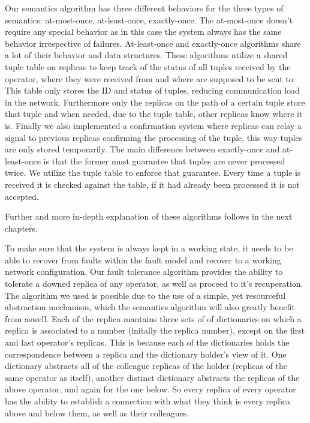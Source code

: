 \documentclass[times, 10pt,twocolumn]{article}
\begin{document}
	Our semantics algorithm has three different behaviors for the three types 
of semantics: at-most-once, at-least-once, exactly-once. The at-most-once
doesn't require any special behavior as in this case the system always has the same 
behavior irrespective of failures. At-least-once and exactly-once algorithms share 
a lot of their behavior and data structures. These algorithms utilize a shared tuple table
on replicas to keep track of the status of all tuples received by the operator, 
where they were received from and where are supposed to be sent to. This
table only stores the ID and status of tuples, reducing communication load in the
network. Furthermore only the replicas on the path of a certain tuple store that tuple 
and when needed, due to the tuple table, other replicas know where it is. Finally we also
implemented a confirmation system where replicas can relay a signal to previous replicas
confirming the processing of the tuple, this way tuples are only stored temporarily. 
The main difference between exactly-once and at-least-once is that the former 
must guarantee that tuples are never processed twice. We utilize the tuple table
to enforce that guarantee. Every time a tuple is received it is checked against the 
table, if it had already been processed it is not accepted. 

	Further and more in-depth explanation of these algorithms follows in the next chapters.


To make sure that the system is always kept in a working state, it needs
to be able to recover from faults within the fault model and recover to a
working network configuration. Our fault tolerance algorithm provides the
ability to tolerate a downed replica of any operator, as well as proceed
to it's recuperation. The algorithm we used is possible due to the use of
a simple, yet resourceful abstraction mechanism, which the semantics
algorithm will also greatly benefit from aswell. Each of the replica
mantains three sets of of dictionaries on which a replica is associated to
a number (initally the replica number), except on the first and last
operator's replicas. This is because each of the dictionaries holds the
correspondence between a replica and the dictionary holder's view of it.
One dictionary abstracts all of the colleague replicas of the holder
(replicas of the same operator as itself), another distinct dictionary
abstracts the replicas of the above operator, and again for the one below.
So every replica of every operator has the ability to establish a
connection with what they think is every replica above and below them, as
well as their colleagues.
\end{document}
